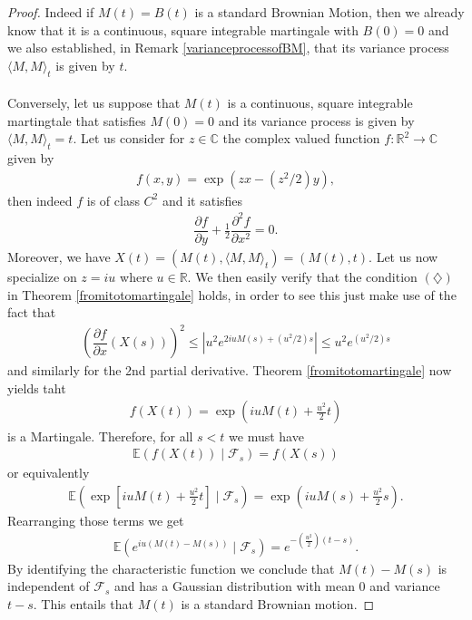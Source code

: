 \documentclass[11pt,a4paper, final]{article}
\begin{document}
\begin{proof}
Indeed if $M(t)=B(t)$ is a standard Brownian Motion, then we already know that it is a continuous, square integrable martingale with $B(0)=0$ and we also established, in Remark \ref{varianceprocessofBM}, that its variance process $\langle M, M \rangle_t$ is given by $t$.
\\\\
Conversely, let us suppose that $M(t)$ is a continuous, square integrable martingtale that satisfies $M(0)=0$ and its variance process is given by $\langle M, M \rangle_t =t$.  Let us consider for $z \in \mathbb{C}$ the complex valued function $f: \mathbb{R}^2 \to \mathbb{C}$ given by 
\begin{align*}
f(x,y)= \exp ( zx-(z^2/2)y),
\end{align*}
then indeed $f$ is of class $C^2$ and it satisfies 
\begin{align*}
\dfrac{\partial f}{\partial y} + \frac{1}{2} \dfrac{\partial^2f}{\partial x^2}=0.
\end{align*}
Moreover, we have $X(t)=(M(t), \langle M, M \rangle_t ) = (M(t), t)$. Let us now specialize on $z=iu$ where $u \in \mathbb{R}$. We then easily verify that the condition $(\diamondsuit)$ in Theorem \ref{fromitotomartingale} holds, in order to see this just make use of the fact that 
\begin{align*}
\left( \dfrac{\partial f}{\partial x}(X(s)) \right)^2
\leq \left| u^2 e^{2iu M(s) + (u^2/2) s} \right| \leq u^2 e^{(u^2/2)s}
\end{align*} 
and similarly for the 2nd partial derivative. Theorem \ref{fromitotomartingale} now yields taht  
\begin{align*}
f(X(t)) = \exp \left( i u M(t) + \frac{u^2}{2}t \right) 
\end{align*}
is a Martingale. Therefore, for all $s <t$ we must have 
\begin{align*}
\mathbb{E}(f(X(t)) \mid \mathcal{F}_s) = f(X(s))
\end{align*}
or equivalently 
\begin{align*}
\mathbb{E}\left( \exp \left[ i u M(t) + \frac{u^2}{2}t \right] \mid \mathcal{F}_s \right) = \exp \left( i u M(s) + \frac{u^2}{2}s \right). 
\end{align*}
Rearranging those terms we get 
\begin{align*}
\mathbb{E} \left( e^{iu(M(t)-M(s))} \mid \mathcal{F}_s \right) = e^{- \left( \frac{u^2}{2} \right)(t-s)}.
\end{align*}
By identifying the characteristic function we conclude that $M(t)-M(s)$ is independent of $\mathcal{F}_s$ and has a Gaussian distribution with mean $0$ and variance $t-s$. This entails that $M(t)$ is a standard Brownian motion. 
\end{proof}
\newpage
\end{document}
